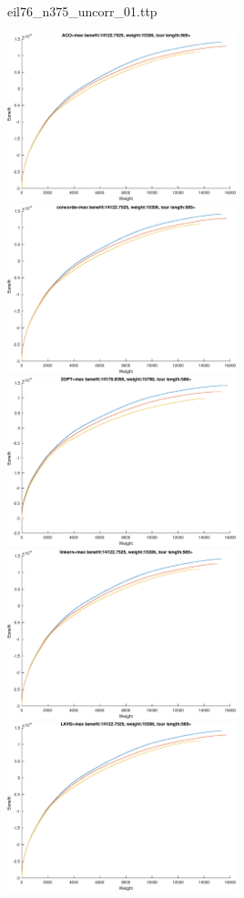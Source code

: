 \documentclass{article}
\begin{document}
\newpage
eil76\_n375\_uncorr\_01.ttp

\noindent
\includegraphics[width=0.5\textwidth]{eil76figs/eil76_n375_uncorr_01.ttp.aco.txt.atsf.eps}
\includegraphics[width=0.5\textwidth]{eil76figs/eil76_n375_uncorr_01.ttp.con.txt.atsf.eps}
\includegraphics[width=0.5\textwidth]{eil76figs/eil76_n375_uncorr_01.ttp.inv.txt.atsf.eps}
\includegraphics[width=0.5\textwidth]{eil76figs/eil76_n375_uncorr_01.ttp.lkh.txt.atsf.eps}
\includegraphics[width=0.5\textwidth]{eil76figs/eil76_n375_uncorr_01.ttp.lkh2.txt.atsf.eps}
\end{document}
